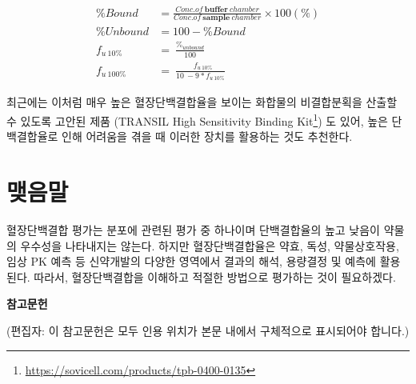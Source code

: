 \documentclass[
  11pt,
  krantz2, a4paper, twoside]{krantz}
\begin{document}
\begin{equation}
\begin{split}
\% Bound &= \frac{Conc.of\ \mathbf{buffer}\ chamber}{Conc.of\ \mathbf{sample}\ chamber} \times 100(\%) \\
\% Unbound &= 100 - \% Bound \\
f_{u\ 10\%} &= \ \frac{\%_{unbound}}{100} \\ 
f_{u\ 100\%} &= \ \frac{{\ \ \ f}_{u\ 10\%}}{10\  - 9*f_{u\ 10\%}}
\end{split}
\label{eq:eq03-03} 
\end{equation}

최근에는 이처럼 매우 높은 혈장단백결합율을 보이는 화합물의 비결합분획을 산출할 수 있도록 고안된 제품 (TRANSIL High Sensitivity Binding Kit\footnote{\url{https://sovicell.com/products/tpb-0400-0135}}) 도 있어, 높은 단백결합율로 인해 어려움을 겪을 때 이러한 장치를 활용하는 것도 추천한다.

\section{맺음말}\label{uxb9fauxc74cuxb9d0-2}

혈장단백결합 평가는 분포에 관련된 평가 중 하나이며 단백결합율의 높고 낮음이 약물의 우수성을 나타내지는 않는다. 하지만 혈장단백결합율은 약효, 독성, 약물상호작용, 임상 PK 예측 등 신약개발의 다양한 영역에서 결과의 해석, 용량결정 및 예측에 활용된다. 따라서, 혈장단백결합을 이해하고 적절한 방법으로 평가하는 것이 필요하겠다.

\textbf{참고문헌}

(편집자: 이 참고문헌은 모두 인용 위치가 본문 내에서 구체적으로 표시되어야 합니다.)
\end{document}
